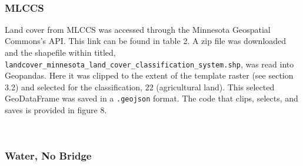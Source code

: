 \documentclass[article,12pt]{article}
\numberwithin{equation}{section}
\begin{document}
\\

\subsubsection{MLCCS}

Land cover from MLCCS was accessed through the Minnesota Geospatial Commons's API. This link can be found in table 2. A zip file was downloaded and the shapefile within titled, \texttt{landcover\_minnesota\_land\_cover\_classification\_system.shp}, was read into Geopandas. Here it was clipped to the extent of the template raster (see section 3.2) and selected for the classification, 22 (agricultural land). This selected GeoDataFrame was saved in a \texttt{.geojson} format. The code that clips, selects, and saves is provided in figure 8.




\begin{adjustwidth}{-.7in}{-.7in}
	\\
\end{adjustwidth}
\newpage
\subsubsection{Water, No Bridge}
\end{document}
